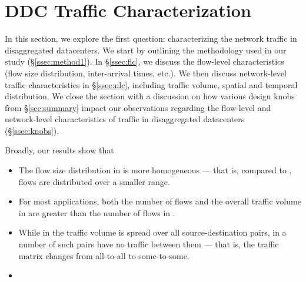 \section{DDC Traffic Characterization}
\label{sec:workloads}
In this section, we explore the first question: characterizing the network traffic in disaggregated datacenters. We start by outlining the methodology used in our study (\S\ref{ssec:method1}). In \S\ref{ssec:flc}, we discuss the flow-level characteristics (flow size distribution, inter-arrival times, etc.). We then discuss network-level traffic characteristics in \S\ref{ssec:nlc}, including traffic volume, spatial and temporal distribution. We close the section with a discussion on how various design knobs from \S\ref{sec:summary} impact our observations regarding the flow-level and network-level characteristics of traffic in disaggregated datacenters (\S\ref{ssec:knobs}).

Broadly, our results show that
\begin{itemize}
\item The flow size distribution in \dis is more homogeneous --- that is, compared to \pdis, flows are distributed over a smaller range.
\item For most applications, both the number of flows and the overall traffic volume in \dis are greater than the number of flows in \pdis.
\item While in \pdis the traffic volume is spread over all source-destination pairs, in \dis a number of such pairs have no traffic between them --- that is, the traffic matrix changes from all-to-all to some-to-some.
\item {}
\end{itemize}

